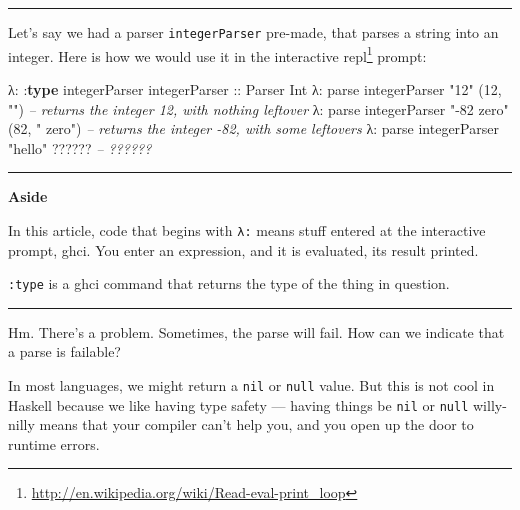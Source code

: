 \documentclass[]{article}
\newenvironment{Shaded}{}{}
\newcommand{\KeywordTok}[1]{\textcolor[rgb]{0.00,0.44,0.13}{\textbf{{#1}}}}
\newcommand{\DataTypeTok}[1]{\textcolor[rgb]{0.56,0.13,0.00}{{#1}}}
\newcommand{\DecValTok}[1]{\textcolor[rgb]{0.25,0.63,0.44}{{#1}}}
\newcommand{\StringTok}[1]{\textcolor[rgb]{0.25,0.44,0.63}{{#1}}}
\newcommand{\CommentTok}[1]{\textcolor[rgb]{0.38,0.63,0.69}{\textit{{#1}}}}
\newcommand{\OtherTok}[1]{\textcolor[rgb]{0.00,0.44,0.13}{{#1}}}
\newcommand{\FunctionTok}[1]{\textcolor[rgb]{0.02,0.16,0.49}{{#1}}}
\newcommand{\NormalTok}[1]{{#1}}
\renewcommand{\href}[2]{#2\footnote{\url{#1}}}
\begin{document}
\begin{center}\rule{0.5\linewidth}{\linethickness}\end{center}

Let's say we had a parser \texttt{integerParser} pre-made, that parses a
string into an integer. Here is how we would use it in the interactive
\href{http://en.wikipedia.org/wiki/Read-eval-print_loop}{repl} prompt:

\begin{Shaded}
\begin{Highlighting}[]
\NormalTok{λ}\FunctionTok{:} \FunctionTok{:}\KeywordTok{type} \NormalTok{integerParser}
\OtherTok{integerParser ::} \DataTypeTok{Parser} \DataTypeTok{Int}
\NormalTok{λ}\FunctionTok{:} \NormalTok{parse integerParser }\StringTok{"12"}
\NormalTok{(}\DecValTok{12}\NormalTok{, }\StringTok{""}\NormalTok{)                    }\CommentTok{-- returns the integer 12, with nothing leftover}
\NormalTok{λ}\FunctionTok{:} \NormalTok{parse integerParser }\StringTok{"-82 zero"}
\NormalTok{(}\DecValTok{82}\NormalTok{, }\StringTok{" zero"}\NormalTok{)               }\CommentTok{-- returns the integer -82, with some leftovers}
\NormalTok{λ}\FunctionTok{:} \NormalTok{parse integerParser }\StringTok{"hello"}
\FunctionTok{??????}                      \CommentTok{-- ??????}
\end{Highlighting}
\end{Shaded}

\begin{center}\rule{0.5\linewidth}{\linethickness}\end{center}

\textbf{Aside}

In this article, code that begins with \texttt{λ:} means stuff entered
at the interactive prompt, ghci. You enter an expression, and it is
evaluated, its result printed.

\texttt{:type} is a ghci command that returns the type of the thing in
question.

\begin{center}\rule{0.5\linewidth}{\linethickness}\end{center}

Hm. There's a problem. Sometimes, the parse will fail. How can we
indicate that a parse is failable?

In most languages, we might return a \texttt{nil} or \texttt{null}
value. But this is not cool in Haskell because we like having type
safety --- having things be \texttt{nil} or \texttt{null} willy-nilly
means that your compiler can't help you, and you open up the door to
runtime errors.
\end{document}

